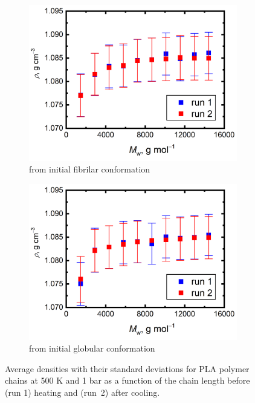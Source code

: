 \begin{figure}[htb!]
	\begin{subfigure}{0.5\textwidth}
		\includegraphics[width=1.0\linewidth]{img/pla_linear_density.png} 
		\caption{from initial fibrilar conformation}
		\vspace{-0.2cm}
	\end{subfigure}
	\begin{subfigure}{0.5\textwidth}
		\includegraphics[width=1.0\linewidth]{img/pla_glob_density.png}
		\caption{from initial globular conformation}
		\vspace{-0.2cm}
	\end{subfigure} 
	\caption{Average densities with their standard deviations for PLA polymer chains at 500 K and 1 bar as a function of the chain length before (run 1) heating and (run~2) after cooling.}
	\label{fig:pla_hustoty}
	\vspace{-0.4cm}
\end{figure}


